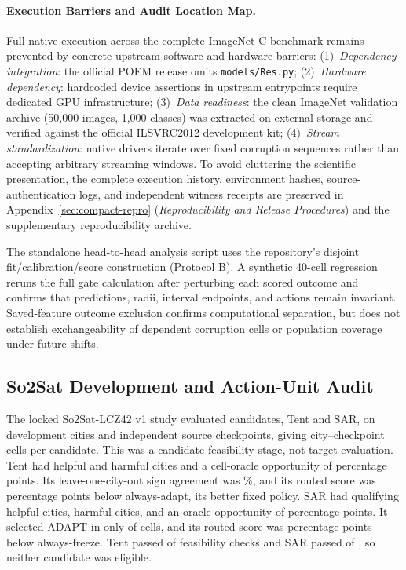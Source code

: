 \paragraph{Execution Barriers and Audit Location Map.}
Full native execution across the complete ImageNet-C benchmark remains prevented by concrete upstream
software and hardware barriers: (1)~\emph{Dependency integration}: the official POEM release omits
\texttt{models/Res.py}; (2)~\emph{Hardware dependency}: hardcoded device assertions in upstream
entrypoints require dedicated GPU infrastructure; (3)~\emph{Data readiness}: the clean ImageNet validation
archive (50,000 images, 1,000 classes) was extracted on external storage and verified against the official
ILSVRC2012 development kit; (4)~\emph{Stream standardization}: native drivers iterate over fixed corruption
sequences rather than accepting arbitrary streaming windows.
To avoid cluttering the scientific presentation, the complete execution history, environment hashes,
source-authentication logs, and independent witness receipts are preserved in
Appendix~\ref{sec:compact-repro} (\emph{Reproducibility and Release Procedures}) and the supplementary reproducibility archive.

The standalone head-to-head analysis script uses the repository's disjoint fit/calibration/score
construction (Protocol B). A synthetic 40-cell regression reruns the full gate calculation after perturbing
each scored outcome and confirms that predictions, radii, interval endpoints, and actions remain invariant.
Saved-feature outcome exclusion confirms computational separation, but does not establish exchangeability
of dependent corruption cells or population coverage under future shifts.

\subsection{So2Sat Development and Action-Unit Audit}
\label{app:so2sat-development}

The locked So2Sat-LCZ42 v1 study evaluated \SoTwoCandidateCount{} candidates, Tent and SAR, on
\SoTwoDevelopmentCityCount{} development cities and \SoTwoCheckpointCount{} independent source
checkpoints, giving \SoTwoCellCountPerCandidate{} city--checkpoint cells per candidate. This was a
candidate-feasibility stage, not target evaluation. Tent had \SoTwoTentHelpfulCityCount{} helpful and
\SoTwoTentHarmfulCityCount{} harmful cities and a cell-oracle opportunity of
\SoTwoTentOracleGainPP{} percentage points. Its leave-one-city-out sign agreement was
\SoTwoTentLocoSignPct{}\%, and its routed score was \SoTwoTentLossBestFixedPP{} percentage points
below always-adapt, its better fixed policy. SAR had \SoTwoSarHelpfulCityCount{} qualifying helpful
cities, \SoTwoSarHarmfulCityCount{} harmful cities, and an oracle opportunity of
\SoTwoSarOracleGainPP{} percentage points. It selected ADAPT in only \SoTwoSarAdaptCellCount{} of
\SoTwoCellCountPerCandidate{} cells, and its routed score was \SoTwoSarLossBestFixedPP{} percentage
points below always-freeze. Tent passed \SoTwoTentPassedCheckCount{} of
\SoTwoFeasibilityCheckCount{} feasibility checks and SAR passed \SoTwoSarPassedCheckCount{} of
\SoTwoFeasibilityCheckCount{}, so neither candidate was eligible.

